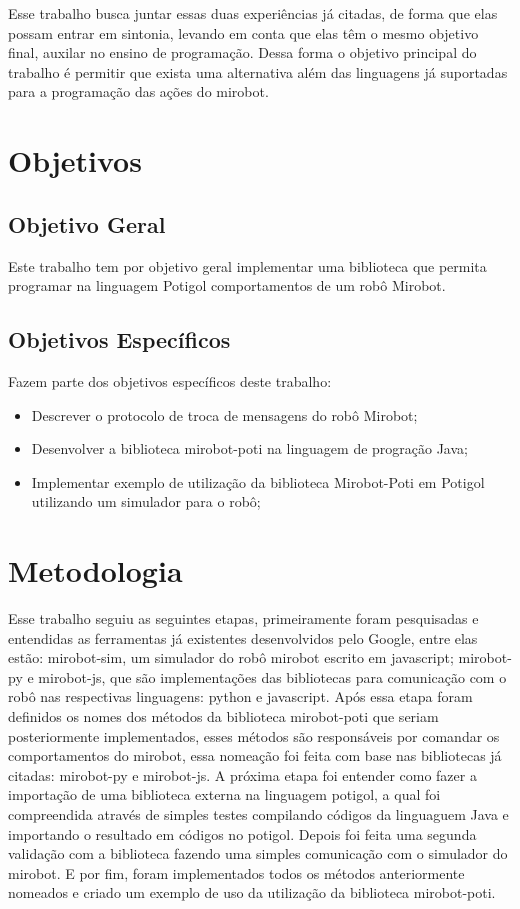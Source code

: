 Esse trabalho busca juntar essas duas experiências já citadas, de forma que
elas possam entrar em sintonia, levando em
conta que elas têm o mesmo objetivo final, auxilar no ensino de programação. 
Dessa forma o objetivo principal do
trabalho é permitir que exista uma alternativa além das linguagens já
suportadas para a programação das ações do mirobot.

\section{Objetivos}

\subsection{Objetivo Geral}

Este trabalho tem por objetivo geral implementar uma biblioteca que permita
programar na linguagem Potigol comportamentos de um robô Mirobot.

\subsection{Objetivos Específicos}

Fazem parte dos objetivos específicos deste trabalho:

\begin{itemize}
  \item Descrever o protocolo de troca de mensagens do robô Mirobot;
  \item Desenvolver a biblioteca mirobot-poti na linguagem de
    progração Java;
  \item Implementar exemplo de utilização da biblioteca
      Mirobot-Poti em Potigol utilizando um simulador para o robô;
\end{itemize}


\section{Metodologia}

Esse trabalho seguiu as seguintes etapas, primeiramente foram pesquisadas e
entendidas as ferramentas já existentes desenvolvidos pelo Google, entre elas estão:
mirobot-sim, um simulador do robô mirobot escrito em javascript; mirobot-py e
mirobot-js, que são implementações das bibliotecas para comunicação com o robô
nas respectivas linguagens: python e javascript. 
Após essa etapa foram
definidos os nomes dos métodos da biblioteca mirobot-poti que seriam
posteriormente implementados, esses métodos são responsáveis por comandar os
comportamentos do mirobot, essa nomeação foi feita com base nas bibliotecas já
citadas: mirobot-py e mirobot-js.
A próxima etapa foi entender como fazer a
importação de uma biblioteca externa na linguagem potigol, a qual foi
compreendida através de simples testes compilando códigos da linguaguem Java e
importando o resultado em códigos no potigol. 
Depois foi feita uma
segunda validação com a biblioteca fazendo uma simples
comunicação com o simulador do mirobot. 
E por fim, foram implementados todos os métodos anteriormente
nomeados e criado um exemplo de uso da utilização da biblioteca mirobot-poti.

